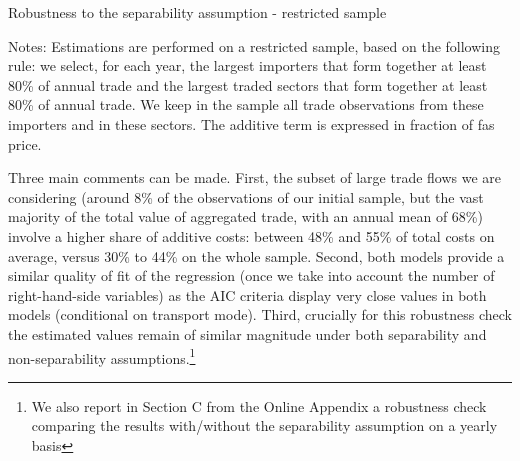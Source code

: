 \documentclass[a4paper,11pt]{article}
\begin{document}
\begin{table}[htbp]
	\centering
	\caption{Robustness to the separability assumption - restricted sample}
	\begin{center}
			
%			
	\end{center}
	\parbox[l]{12cm}{\footnotesize{Notes: Estimations are performed on a restricted sample, based on the following rule:  we select, for each year, the largest importers that form together at least 80\% of annual trade and the largest traded sectors that form together at least 80\% of annual trade. We keep in the sample all trade observations from these importers and in these sectors.
			The additive term is expressed in fraction of fas price.}}
	\label{tab:robustness_separability}
\end{table}


Three main comments can be made. First, the subset of large trade flows we are considering (around 8\% of the observations of our initial sample, but the vast majority of the total value of aggregated trade, with an annual mean of 68\%) involve a higher share of additive costs: between 48\% and 55\% of total costs on average, versus 30\% to 44\% on the whole sample.
Second, both models provide a similar quality of fit of the regression (once we take into account the number of right-hand-side variables) as the AIC criteria display very close values in both models (conditional on transport mode). Third, crucially for this robustness check the estimated values remain of similar magnitude under both separability and non-separability assumptions.\footnote{We also report in Section C from the Online Appendix a robustness check comparing the results with/without the separability assumption on a yearly basis} %
\end{document}
